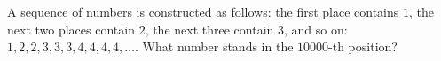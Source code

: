 A sequence of numbers is constructed as follows: the first place contains $1$, the next two places contain $2$, the next three contain $3$, and so on: $1, 2, 2, 3, 3, 3, 4, 4, 4, 4, \ldots$. What number stands in the $10000$-th position?
